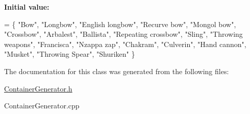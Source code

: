 {\bfseries Initial value\+:}
\begin{DoxyCode}
= \{
    \textcolor{stringliteral}{"Bow"},
    \textcolor{stringliteral}{"Longbow"},
    \textcolor{stringliteral}{"English longbow"},
    \textcolor{stringliteral}{"Recurve bow"},
    \textcolor{stringliteral}{"Mongol bow"},
    \textcolor{stringliteral}{"Crossbow"},
    \textcolor{stringliteral}{"Arbalest"},
    \textcolor{stringliteral}{"Ballista"},
    \textcolor{stringliteral}{"Repeating crossbow"},
    \textcolor{stringliteral}{"Sling"},
    \textcolor{stringliteral}{"Throwing weapons"},
    \textcolor{stringliteral}{"Francisca"},
    \textcolor{stringliteral}{"Nzappa zap"},
    \textcolor{stringliteral}{"Chakram"},
    \textcolor{stringliteral}{"Culverin"},
    \textcolor{stringliteral}{"Hand cannon"},
    \textcolor{stringliteral}{"Musket"},
    \textcolor{stringliteral}{"Throwing Spear"},
    \textcolor{stringliteral}{"Shuriken"}
\}
\end{DoxyCode}


The documentation for this class was generated from the following files\+:\begin{DoxyCompactItemize}
\item 
\hyperlink{_container_generator_8h}{Container\+Generator.\+h}\item 
Container\+Generator.\+cpp\end{DoxyCompactItemize}
